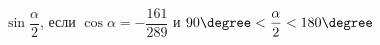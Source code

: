\begin{ex}[type=simplify_calculate]
	\begin{condition}
		\( \sin\dfrac{\alpha}{2} \), \quad если \( \cos\alpha=-\dfrac{161}{289} \) и \( 90\degree<\dfrac{\alpha}{2}<180\degree \)
	\end{condition}
\end{ex}